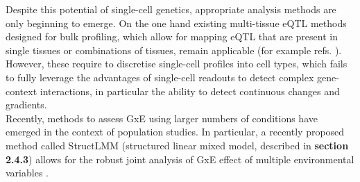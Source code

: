 Despite this potential of single-cell genetics, appropriate analysis methods are only beginning to emerge. 
On the one hand existing multi-tissue eQTL methods designed for bulk profiling, which allow for mapping eQTL that are present in single tissues or combinations of tissues, remain applicable 
(for example refs. \cite{ding2010gene, petretto2010new, nica2011architecture, fu2012unraveling, flutre2013statistical,sul2013effectively, di2014meta, li2018empirical, urbut2019flexible}).
However, these require to discretise single-cell profiles into cell types, which fails to fully leverage the advantages of single-cell readouts to detect complex gene-context interactions, in particular the ability to detect continuous changes and gradients. \\

Recently, methods to assess GxE using larger numbers of conditions have emerged in the context of population studies.
In particular, a recently proposed method called StructLMM (structured linear mixed model, described in \textbf{section 
2.4.3}) allows for the robust joint analysis of GxE effect of multiple environmental variables \cite{moore2019linear}. \\




